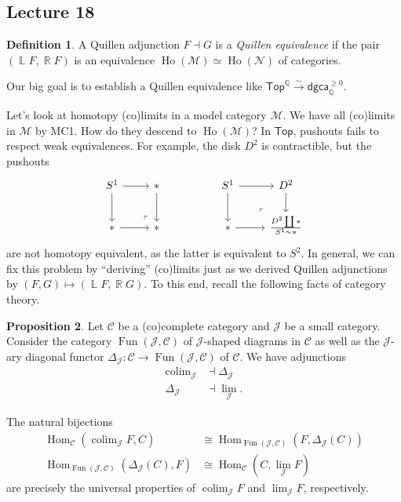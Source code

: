 \documentclass[10pt,letterpaper,cm]{nupset}
\theoremstyle{definition}
\newtheorem{defn}{Definition}[subsection]
\theoremstyle{theorem}
\newtheorem{prop}[defn]{Proposition}
\theoremstyle{remark}
\DeclareMathOperator{\Ll}{\mathbb L}
\newcommand{\Q}{\mathbb Q}
\DeclareMathOperator{\R}{\mathbb{R}}
\newcommand{\1}{\mathbb{1}}
\renewcommand{\c}{\mathcal{C}}
\renewcommand{\j}{\mathcal{J}}
\newcommand{\n}{\mathcal{N}}
\newcommand{\m}{\mathcal{M}}
\newcommand{\dgca}{\mathsf{dgca}}
\newcommand{\0}{\vec 0}
\DeclareMathOperator{\fun}{Fun}
\DeclareMathOperator{\ho}{Ho}
\DeclareMathOperator{\Hom}{Hom}
\DeclareMathOperator{\colim}{colim}
\begin{document}
\subsection{Lecture 18}

\begin{defn}
A Quillen adjunction $F \dashv G$ is a \textit{Quillen equivalence} if the pair $\left(\Ll{F}, \R{F}\right)$ is an equivalence $\ho(\m) \simeq \ho(\n)$ of categories. 
\end{defn}

Our big goal is to establish a Quillen equivalence like $\mathsf{Top}^{\Q} \xrightarrow{\sim} \dgca_{\Q}^{\geq 0}$.

\bigskip

Let's look at homotopy (co)limits in a model category $\m$. We have all (co)limits in $\m$ by MC1. How do they descend to $\ho(\m)$? In $\mathsf{Top}$, pushouts fails to respect weak equivalences. For example, the disk $D^2$ is contractible, but the pushouts
\[
\begin{tikzcd}
	{S^1} & \ast && {S^1} & {D^2} \\
	\ast & \ast && \ast & {\frac{D^2 \coprod \ast}{S^1 \sim \ast}}
	\arrow[from=1-1, to=2-1]
	\arrow[from=1-1, to=1-2]
	\arrow[from=2-1, to=2-2]
	\arrow[from=1-2, to=2-2]
	\arrow[from=1-4, to=2-4]
	\arrow[from=1-4, to=1-5]
	\arrow[from=1-5, to=2-5]
	\arrow[from=2-4, to=2-5]
	\arrow["\lrcorner"{anchor=center, pos=0.125, rotate=180}, draw=none, from=2-5, to=1-4]
	\arrow["\lrcorner"{anchor=center, pos=0.125, rotate=180}, draw=none, from=2-2, to=1-1]
\end{tikzcd}
\] are not homotopy equivalent, as the latter is equivalent to $S^2$. In general, we can fix this problem by ``deriving'' (co)limits just as we derived Quillen adjunctions by $\left(F, G\right) \mapsto \left(\Ll{F}, \R{G}\right)$. To this end, recall the following facts of category theory.

\begin{prop}
Let $\c$ be a (co)complete category and $\j$ be a small category. Consider the category $\fun(\j, \c)$ of $\j$-shaped diagrams in $\c$ as well as the $\j$-ary diagonal functor  $\Delta_{\j} : \c \to \fun(\j, \c)$ of $\c$. We have adjunctions
\begin{align*}
\colim_{\j} & \dashv \Delta_{\j}
\\ \Delta_{\j} & \dashv \lim_{\j}
.\end{align*}
\end{prop}

The natural bijections
\begin{align*}
\Hom_{\c}(\colim_{\j}{F}, C) & \cong \Hom_{\fun(\j, \c)}(F, \Delta_{\j}(C))
\\ \Hom_{\fun(\j, \c)}(\Delta_{\j}(C), F) &  \cong \Hom_{\c}(C, \lim_{\j}{F})
\end{align*}
are precisely the universal properties of $\colim_{\j}{F}$ and $\lim_{\j}{F}$, respectively. 
\end{document}
